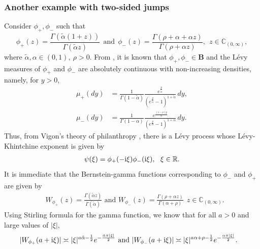 \documentclass[12pt]{amsart}
\newcommand{\hlabel}{\phantomsection\label}
\numberwithin{equation}{section}
\newcommand{\bb}{\mathbb}
\newcommand{\B}{\mathbf{B}}
\theoremstyle{definition}
\theoremstyle{assump}
\theoremstyle{remark}
\begin{document}
{\subsubsection{Another example with two-sided jumps}\hlabel{ex:two_sided} Consider $\phi_+, \phi_-$ such that
\begin{equation*}
 \phi_+(z)=\frac{\Gamma(\tilde{\alpha}(1+z))}{\Gamma(\tilde{\alpha} z)} \ \ \mbox{and} \ \ \phi_-(z)=\frac{\Gamma(\rho+\alpha+\alpha z)}{\Gamma(\rho+\alpha z)}, \ \ z \in\bb{C}_{(0,\infty)},
 \end{equation*}
 where $\tilde{\alpha},\alpha\in (0,1), \ \rho>0$. From \cite{kp2013}, it is known that $\phi_+, \phi_-\in\B$ and the L\'evy measures of $\phi_+$ and $\phi_-$ are absolutely continuous with  non-increasing densities, namely, for $y>0$,
 \begin{equation*}
 \begin{aligned}
 \mu_+(dy)&=\frac{1}{\Gamma(1-\tilde{\alpha})}\frac{e^{\frac{y}{\tilde{\alpha}}}}{(e^{\frac{y}{\tilde{\alpha}}}-1)^{1+\tilde{\alpha}}}\,dy, \\
 \mu_-(dy)&=\frac{1}{\Gamma(1-\alpha)}\frac{e^{\frac{(1-\rho)y}{\alpha}}}{(e^{\frac{y}{\alpha}}-1)^{1+\alpha}}\,dy.
 \end{aligned}
 \end{equation*}
 Thus, from Vigon's theory of philanthropy \cite{vigon2002}, there is a L\'evy process whose L\'evy-Khintchine exponent is given by
 \begin{align*}
 \psi(\xi)=\phi_+(-{\rm{i}}\xi   )\phi_-({\rm{i}}\xi   ), \ \ \xi\in\bb{R}.
 \end{align*}
It is immediate that the Bernstein-gamma functions corresponding to $\phi_-$ and $\phi_+$ are  given by
\begin{equation*}
\begin{aligned}
&W_{\phi_+}(z)=\frac{\Gamma(\tilde{\alpha} z)}{\Gamma(\tilde{\alpha})}\textrm{ and }
 W_{\phi_-}(z)=\frac{\Gamma(\rho+\alpha z)}{\Gamma(\alpha+\rho)} \ \  z\in\bb{C}_{(0,\infty)}.
\end{aligned}
\end{equation*}
Using Stirling formula for the gamma function, we know that for all $a>0$ and large values of $|\xi|$,
\begin{equation*}
\begin{aligned}
&|W_{\phi_+}(a+{\rm{i}}\xi)   |\asymp |\xi|^{a\tilde{\alpha}-\frac{1}{2}} e^{-\frac{\tilde{\alpha}\pi |\xi|}{2}} \textrm{ and }
|W_{\phi_-}(a+{\rm{i}}\xi)   |\asymp |\xi|^{a\alpha+\rho-\frac{1}{2}}e^{-\frac{\alpha \pi |\xi|}{2}}.

\end{aligned}
\end{equation*}}
\end{document}
